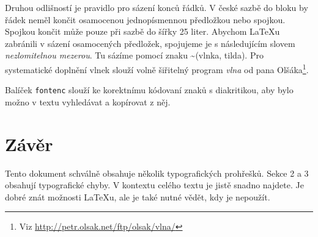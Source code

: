 \documentclass[a4paper,twocolumn, 10pt]{article}
\begin{document}
Druhou odlišností je pravidlo pro sázení konců řádků.
V české sazbě do bloku by řádek neměl končit osamocenou jednopísmennou předložkou nebo spojkou. Spojkou  končit může pouze při sazbě do šířky 25 liter. Abychom \LaTeX u zabránili v sázení osamocených předložek, spojujeme je s následujícím slovem \textit{nezlomitelnou mezerou}. Tu sázíme pomocí znaku \textasciitilde (vlnka, tilda). Pro systematické doplnění vlnek slouží volně šiřitelný program \textit{vlna} od pana Olšáka\footnote{Viz \url{http://petr.olsak.net/ftp/olsak/vlna/}}.

Balíček \texttt{fontenc} slouží ke korektnímu kódovaní znaků
s diakritikou, aby bylo možno v textu vyhledávat a kopírovat z něj.

\section{Závěr}

\maketitle
Tento dokument schválně obsahuje několik typografických
prohřešků. Sekce 2 a 3 obsahují typografické chyby. V kontextu celého textu je jistě snadno najdete. Je dobré znát
možnosti \LaTeX u, ale je také nutné vědět, kdy je nepoužít.
\end{document}
